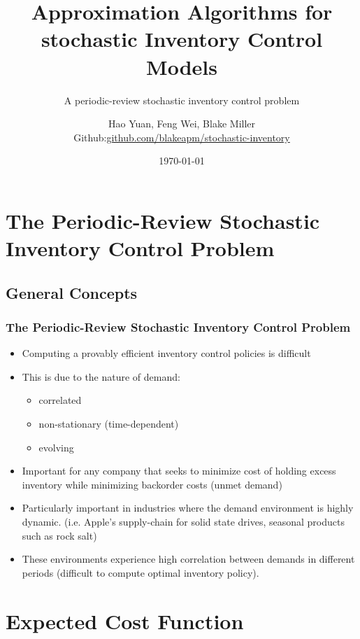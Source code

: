 \documentclass{beamer}
\title{Approximation Algorithms for stochastic Inventory Control Models}
\subtitle{A periodic-review stochastic inventory control problem}
\author[Hao Yuan, Feng Wei, Blake Miller]{Hao Yuan, Feng Wei, Blake Miller \\ {\ttfamily Github:\href{https://github.com/blakeapm/stochastic-inventory}{github.com/blakeapm/stochastic-inventory}}}
\date{\today}
\begin{document}
  \frame{\titlepage}
  \section{The Periodic-Review Stochastic Inventory Control Problem}
  \subsection{General Concepts}
  \begin{frame}
    \frametitle{The Periodic-Review Stochastic Inventory Control Problem}
    \begin{itemize}
      \item Computing a provably efficient inventory control policies is difficult
      \item This is due to the nature of demand:
        \begin{itemize}
          \item correlated
          \item non-stationary (time-dependent)
          \item evolving
        \end{itemize}
      \item Important for any company that seeks to minimize cost of holding excess inventory while minimizing backorder costs (unmet demand)
      \item Particularly important in industries where the demand environment is highly dynamic. (i.e. Apple's supply-chain for solid state drives, seasonal products such as rock salt)
      \item These environments experience high correlation between demands in different periods (difficult to compute optimal inventory policy).
    \end{itemize}
  \end{frame}

  \section{Expected Cost Function}
\end{document}
